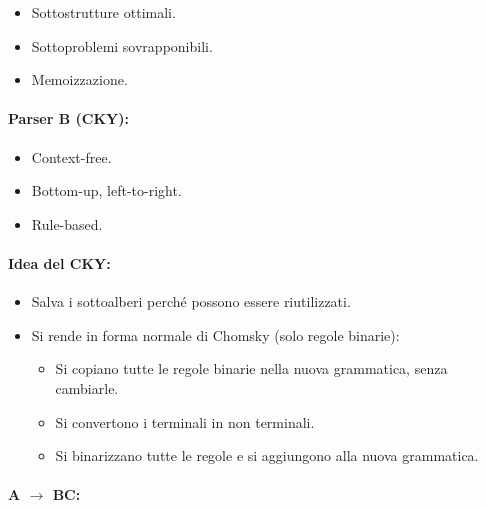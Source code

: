 \begin{itemize}
  \item Sottostrutture ottimali. 
  \item Sottoproblemi sovrapponibili. 
  \item Memoizzazione.
\end{itemize}



\paragraph{Parser B (CKY):}

\begin{itemize}
  \item Context-free. 
  \item Bottom-up, left-to-right. 
  \item Rule-based.
\end{itemize}

\paragraph{Idea del CKY:}

\begin{itemize}
  \item Salva i sottoalberi perché possono essere riutilizzati. 
  \item Si rende in forma normale di Chomsky (solo regole binarie): 
    \begin{itemize}
      \item Si copiano tutte le regole binarie nella nuova grammatica, senza cambiarle. 
      \item Si convertono i terminali in non terminali. 
      \item Si binarizzano tutte le regole e si aggiungono alla nuova grammatica.
    \end{itemize}
\end{itemize}

\paragraph{A $\rightarrow$ BC:}

